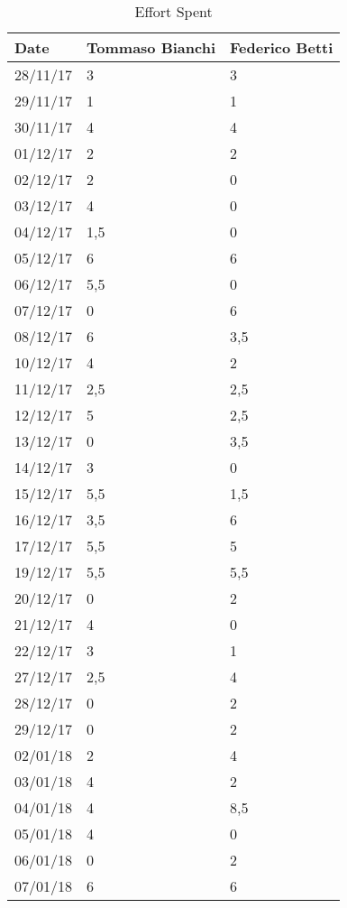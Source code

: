 \begin{table}[H]	
	\centering
	\def\arraystretch{1.25}
	\begin{tabular}{|m{5cm}|m{5cm}|m{5cm}|}
		\hline
		\textbf{Date} & \textbf{Tommaso Bianchi} &  \textbf{Federico Betti}\\ \hline
		28/11/17 &	3 &	3 \\ \hline
		29/11/17 &	1 &	1 \\ \hline
		30/11/17 &	4 &	4 \\ \hline
		01/12/17 &	2 &	2 \\ \hline
		02/12/17 &	2 & 0	 \\ \hline
		03/12/17 &	4 &  0\\ \hline
		04/12/17 &	1,5 & 0 \\ \hline
		05/12/17 &	6 &	6 \\ \hline
		06/12/17 &	5,5 & 0	 \\ \hline
		07/12/17 &	0 &	6 \\ \hline
		08/12/17 &	6 &	3,5 \\ \hline
		10/12/17 &	4 &	2 \\ \hline
		11/12/17 &	2,5 &	2,5 \\ \hline
		12/12/17 &	5 &	2,5 \\ \hline
		13/12/17 &	0 &	3,5 \\ \hline
		14/12/17 &	3 & 0	 \\ \hline
		15/12/17 &	5,5 &	1,5 \\ \hline
		16/12/17 &	3,5 &	6 \\ \hline
		17/12/17 &	5,5 &	5 \\ \hline
		19/12/17 &	5,5 &	5,5 \\ \hline
		20/12/17 &	0 &	2 \\ \hline
		21/12/17 &	4 & 0	 \\ \hline
		22/12/17 &	3 &	1 \\ \hline
		27/12/17 &	2,5 &	4 \\ \hline
		28/12/17 &	0 &	2 \\ \hline
		29/12/17 &	0 &	2 \\ \hline
		02/01/18 &	2 &	4 \\ \hline
		03/01/18 &	4 &	2 \\ \hline
		04/01/18 &	4 &	8,5 \\ \hline
		05/01/18 &	4 & 0	 \\ \hline
		06/01/18 &	0 &	2 \\ \hline
		07/01/18 &	6 &	6 \\ \hline
	\end{tabular}
	\caption{Effort Spent}
\end{table}



